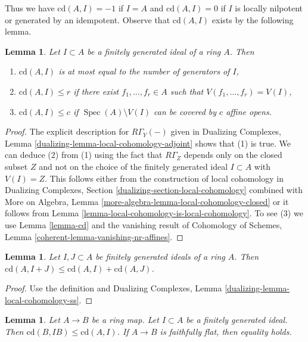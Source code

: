\documentclass{stacks-project}
\theoremstyle{plain}
\newtheorem{lemma}[subsection]{Lemma}
\theoremstyle{definition}
\theoremstyle{remark}
\numberwithin{equation}{subsection}
\def\Spec{\mathop{\mathrm{Spec}}}
\begin{document}
\noindent
Thus we have $\text{cd}(A, I) = -1$ if
$I = A$ and $\text{cd}(A, I) = 0$ if $I$ is locally nilpotent
or generated by an idempotent.
Observe that $\text{cd}(A, I)$ exists by the following lemma.

\begin{lemma}
\label{lemma-bound-cd}
Let $I \subset A$ be a finitely generated ideal of a ring $A$.
Then
\begin{enumerate}
\item $\text{cd}(A, I)$ is at most equal to the number of
generators of $I$,
\item $\text{cd}(A, I) \leq r$ if there exist $f_1, \ldots, f_r \in A$
such that $V(f_1, \ldots, f_r) = V(I)$,
\item $\text{cd}(A, I) \leq c$ if $\Spec(A) \setminus V(I)$
can be covered by $c$ affine opens.
\end{enumerate}
\end{lemma}

\begin{proof}
The explicit description for $R\Gamma_Y(-)$ given in
Dualizing Complexes, Lemma \ref{dualizing-lemma-local-cohomology-adjoint}
shows that (1) is true. We can deduce (2) from (1) using the
fact that $R\Gamma_Z$ depends only on the closed subset
$Z$ and not on the choice of the finitely generated ideal
$I \subset A$ with $V(I) = Z$. This follows either from the
construction of local cohomology in
Dualizing Complexes, Section \ref{dualizing-section-local-cohomology}
combined with
More on Algebra, Lemma \ref{more-algebra-lemma-local-cohomology-closed}
or it follows from Lemma \ref{lemma-local-cohomology-is-local-cohomology}.
To see (3) we use Lemma \ref{lemma-cd}
and the vanishing result of Cohomology of Schemes, Lemma
\ref{coherent-lemma-vanishing-nr-affines}.
\end{proof}

\begin{lemma}
\label{lemma-cd-sum}
Let $I, J \subset A$ be finitely generated ideals of a ring $A$.
Then $\text{cd}(A, I + J) \leq \text{cd}(A, I) + \text{cd}(A, J)$.
\end{lemma}

\begin{proof}
Use the definition and Dualizing Complexes, Lemma
\ref{dualizing-lemma-local-cohomology-ss}.
\end{proof}

\begin{lemma}
\label{lemma-cd-change-rings}
Let $A \to B$ be a ring map. Let $I \subset A$ be a finitely generated ideal.
Then $\text{cd}(B, IB) \leq \text{cd}(A, I)$. If $A \to B$ is faithfully
flat, then equality holds.
\end{lemma}
\end{document}
